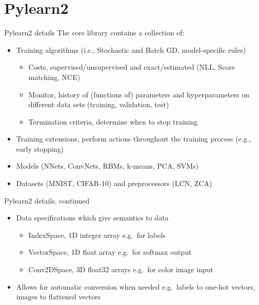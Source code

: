 \documentclass[utf8x,xcolor=pdftex,dvipsnames,table]{beamer}
\begin{document}
\section{Pylearn2}
\begin{frame}
  \tableofcontents[currentsection]
\end{frame}

\begin{frame}{Pylearn2 details}
    The core library contains a collection of:
    \begin{itemize}
      \item Training algorithms (i.e., Stochastic and Batch GD, model-specific rules)
      \begin{itemize}
        \item Costs, supervised/unsupervised and exact/estimated (NLL, Score matching, NCE)
        \item Monitor, history of (functions of) parameters and hyperparameters on different data sets (training, validation, test)
        \item Termination criteria, determine when to stop training
      \end{itemize}
      \item Training extensions, perform actions throughout the training process (e.g., early stopping)
      \item Models (NNets, ConvNets, RBMs, k-means, PCA, SVMs)
      \item Datasets (MNIST, CIFAR-10) and preprocessors (LCN, ZCA)
    \end{itemize}
\end{frame}

\begin{frame}{Pylearn2 details, continued}
\begin{itemize}
  \item Data specifications which give semantics to data
  \begin{itemize}
    \item IndexSpace, 1D integer array e.g.\ for labels
    \item VectorSpace, 1D float array e.g.\ for softmax output
    \item Conv2DSpace, 3D float32 arrays e.g.\ for color image input
  \end{itemize}
  \item Allows for automatic conversion when needed e.g.\ labels to one-hot vectors, images to flattened vectors
\end{itemize}
\end{frame}
\end{document}
